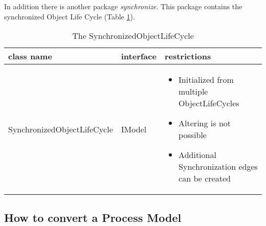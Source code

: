 In addition there is another package \textit{synchronize}. This package contains the synchronized Object Life Cycle (Table \ref{tbl:synchronize_olc}).

\begin{table}[h]
	\centering
	\begin{tabular}{|l|l|p{8cm}|}
		\hline
		\textbf{class name} & \textbf{interface} & \textbf{restrictions}\\
		\hline
		SynchronizedObjectLifeCycle & IModel & \begin{itemize}
					\item Initialized from multiple ObjectLifeCycles
					\item Altering is not possible
					\item Additional Synchronization edges can be created
				\end{itemize}\\
		\hline
	\end{tabular}
	\caption{The SynchronizedObjectLifeCycle}
	\label{tbl:synchronize_olc}
\end{table}

\subsection{How to convert a Process Model}

